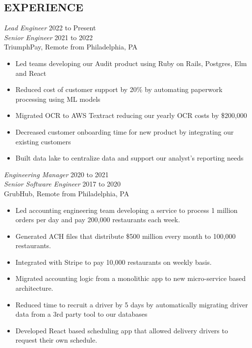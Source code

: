 \documentclass[line]{style}
\begin{document}
\newsectionwidth{0in}

\address{michaelcdalton@gmail.com}
\address{linkedin.com/in/michaelcdalton}

\begin{resume}

\section{EXPERIENCE}

{\sl Lead Engineer} \hfill 2022 to Present \\
{\sl Senior Engineer} \hfill 2021 to 2022 \\
TriumphPay, Remote from Philadelphia, PA
\begin{itemize} \itemsep -2pt
\item Led teams developing our Audit product using Ruby on Rails, Postgres, Elm and React
\item Reduced cost of customer support by 20\% by automating paperwork processing using ML models
\item Migrated OCR to AWS Textract reducing our yearly OCR costs by \$200,000
\item Decreased customer onboarding time for new product by integrating our existing customers
\item Built data lake to centralize data and support our analyst's reporting needs
\end{itemize}

{\sl Engineering Manager} \hfill 2020 to 2021 \\
{\sl Senior Software Engineer} \hfill 2017 to 2020 \\
GrubHub, Remote from Philadelphia, PA
\begin{itemize} \itemsep -2pt
\item Led accounting engineering team developing a service to process 1 million orders per day and pay 200,000 restaurants each week.
\item Generated ACH files that distribute \$500 million every month to 100,000 restaurants.
\item Integrated with Stripe to pay 10,000 restaurants on weekly basis.
\item Migrated accounting logic from a monolithic app to new micro-service based architecture.
\item Reduced time to recruit a driver by 5 days by automatically migrating driver data from a 3rd party tool to our databases
\item Developed React based scheduling app that allowed delivery drivers to request their own schedule.
\end{itemize}


\end{resume}
\end{document}
